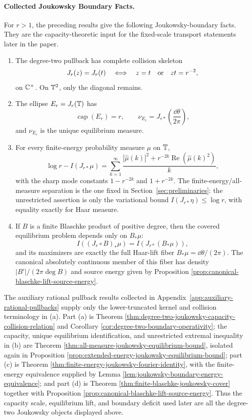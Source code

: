 \paragraph{Collected Joukowsky Boundary Facts.}\label{par:joukowsky-capacity-package-dependencies}
For \(r>1\), the preceding results give the following
Joukowsky-boundary facts.  They are the capacity-theoretic input for the
fixed-scale transport statements later in the paper.
\begin{enumerate}[label=\textup{(\alph*)}]
  \item The degree-two pullback has complete collision skeleton
  \[
  J_r(z)=J_r(t)
  \quad\Longleftrightarrow\quad
  z=t\quad\hbox{or}\quad zt=r^{-2},
  \]
  on \(\mathbb{C}^\times\).  On \(\mathbb{T}^2\), only the diagonal remains.

  \item The ellipse \(E_r=J_r(\mathbb{T})\) has
  \[
  \operatorname{cap}(E_r)=r,
  \qquad
  \nu_{E_r}=J_{r\ast}\!\left(\frac{\dd\theta}{2\pi}\right),
  \]
  and \(\nu_{E_r}\) is the unique equilibrium measure.

  \item For every finite-energy probability measure \(\mu\) on \(\mathbb{T}\),
  \[
  \log r-I(J_{r\ast}\mu)
  =\sum_{k=1}^{\infty}
  \frac{|\widehat\mu(k)|^2+r^{-2k}\operatorname{Re}(\widehat\mu(k)^2)}{k},
  \]
  with the sharp mode constants \(1-r^{-2k}\) and \(1+r^{-2k}\).  The finite-energy/all-measure separation is the one fixed in Section~\ref{sec:preliminaries}: the unrestricted assertion is only the variational bound \(I(J_{r\ast}\eta)\le\log r\), with equality exactly for Haar measure.

  \item If \(B\) is a finite Blaschke product of positive degree, then the covered equilibrium problem depends only on \(B_\ast\mu\):
  \[
  I((J_r\circ B)_\ast\mu)=I(J_{r\ast}(B_\ast\mu)),
  \]
  and its maximizers are exactly the full Haar-lift fiber
  \(B_\ast\mu=\dd\theta/(2\pi)\).  The canonical absolutely continuous
  member of this fiber has density \(|B'|/(2\pi\deg B)\) and source energy
  given by Proposition \ref{prop:canonical-blaschke-lift-source-energy}.
\end{enumerate}
The auxiliary rational pullback results collected in Appendix~\ref{app:auxiliary-rational-pullbacks} supply only the lower-truncated kernel and collision terminology in \textup{(a)}.  Part \textup{(a)} is Theorem \ref{thm:degree-two-joukowsky-capacity-collision-relation} and Corollary \ref{cor:degree-two-boundary-operativity}; the capacity, unique equilibrium identification, and unrestricted extremal inequality in \textup{(b)} are Theorem \ref{thm:all-measure-joukowsky-equilibrium-bound}, isolated again in Proposition \ref{prop:extended-energy-joukowsky-equilibrium-bound}; part \textup{(c)} is Theorem \ref{thm:finite-energy-joukowsky-fourier-identity}, with the finite-energy equivalence supplied by Lemma \ref{lem:joukowsky-boundary-energy-equivalence}; and part \textup{(d)} is Theorem \ref{thm:finite-blaschke-joukowsky-cover} together with Proposition \ref{prop:canonical-blaschke-lift-source-energy}.  Thus the capacity scale, equilibrium lift, and boundary deficit used later are all the degree-two Joukowsky objects displayed above.
